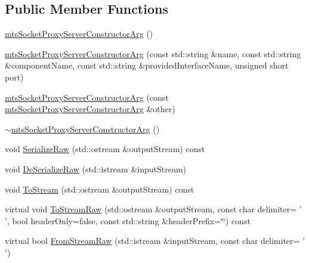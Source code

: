 \subsection*{Public Member Functions}
\begin{DoxyCompactItemize}
\item 
\hyperlink{classmts_socket_proxy_server_constructor_arg_ade6504eac445f0a3f9e8546954e60d3d}{mts\-Socket\-Proxy\-Server\-Constructor\-Arg} ()
\item 
\hyperlink{classmts_socket_proxy_server_constructor_arg_abe971cd2f14fd38f5b49988394242de7}{mts\-Socket\-Proxy\-Server\-Constructor\-Arg} (const std\-::string \&name, const std\-::string \&component\-Name, const std\-::string \&provided\-Interface\-Name, unsigned short port)
\item 
\hyperlink{classmts_socket_proxy_server_constructor_arg_a8c95c6b5cc04b878a91199ff8676506c}{mts\-Socket\-Proxy\-Server\-Constructor\-Arg} (const \hyperlink{classmts_socket_proxy_server_constructor_arg}{mts\-Socket\-Proxy\-Server\-Constructor\-Arg} \&other)
\item 
\hyperlink{classmts_socket_proxy_server_constructor_arg_a156ced3aa467a81cf1b08069263a3b11}{$\sim$mts\-Socket\-Proxy\-Server\-Constructor\-Arg} ()
\item 
void \hyperlink{classmts_socket_proxy_server_constructor_arg_a59d8dec596dad818c0d64545abb66982}{Serialize\-Raw} (std\-::ostream \&output\-Stream) const 
\item 
void \hyperlink{classmts_socket_proxy_server_constructor_arg_a1c85c0b745251f22a54e5b1a635709f1}{De\-Serialize\-Raw} (std\-::istream \&input\-Stream)
\item 
void \hyperlink{classmts_socket_proxy_server_constructor_arg_a086c748c8cfbbe3ae3e4d3daf7125bd7}{To\-Stream} (std\-::ostream \&output\-Stream) const 
\item 
virtual void \hyperlink{classmts_socket_proxy_server_constructor_arg_a3555d9c68b3ce38590adc22c3e0d2755}{To\-Stream\-Raw} (std\-::ostream \&output\-Stream, const char delimiter= ' ', bool header\-Only=false, const std\-::string \&header\-Prefix=\char`\"{}\char`\"{}) const 
\item 
virtual bool \hyperlink{classmts_socket_proxy_server_constructor_arg_ab7ef7061b9cc12774b00c35321fe41b9}{From\-Stream\-Raw} (std\-::istream \&input\-Stream, const char delimiter= ' ')
\end{DoxyCompactItemize}
